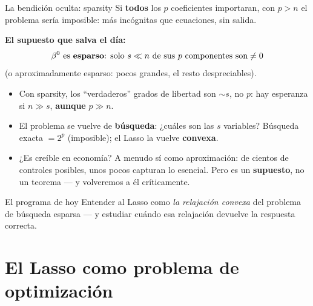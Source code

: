 \documentclass{beamer}
\newcommand{\1}{\mathbb{I}}
\begin{document}
\begin{frame}{La bendición oculta: sparsity}
\small
Si \textbf{todos} los $p$ coeficientes importaran, con $p > n$ el problema sería imposible: más incógnitas que ecuaciones, sin salida.
\pause

\vspace{0.2cm}
\textbf{El supuesto que salva el día:}
\[ \beta^{0} \text{ es \textbf{esparso}: solo } s \ll n \text{ de sus } p \text{ componentes son} \neq 0 \]
(o aproximadamente esparso: pocos grandes, el resto despreciables).
\pause

\begin{itemize}\itemsep5pt
  \item Con sparsity, los ``verdaderos'' grados de libertad son $\sim s$, no $p$: hay esperanza si $n \gg s$, \textbf{aunque} $p \gg n$.
  \item El problema se vuelve de \textbf{búsqueda}: ¿cuáles son las $s$ variables? Búsqueda exacta $= 2^p$ (imposible); el Lasso la vuelve \textbf{convexa}. \pause
  \item ¿Es creíble en economía? A menudo sí como aproximación: de cientos de controles posibles, unos pocos capturan lo esencial. Pero es un \textbf{supuesto}, no un teorema --- y volveremos a él críticamente.
\end{itemize}
\pause

\begin{block}{El programa de hoy}
Entender al Lasso como \emph{la relajación convexa} del problema de búsqueda esparsa --- y estudiar cuándo esa relajación devuelve la respuesta correcta.
\end{block}
\end{frame}


\section{El Lasso como problema de optimización}
\begin{frame}[noframenumbering]
\tableofcontents[currentsection]
\end{frame}
\end{document}
